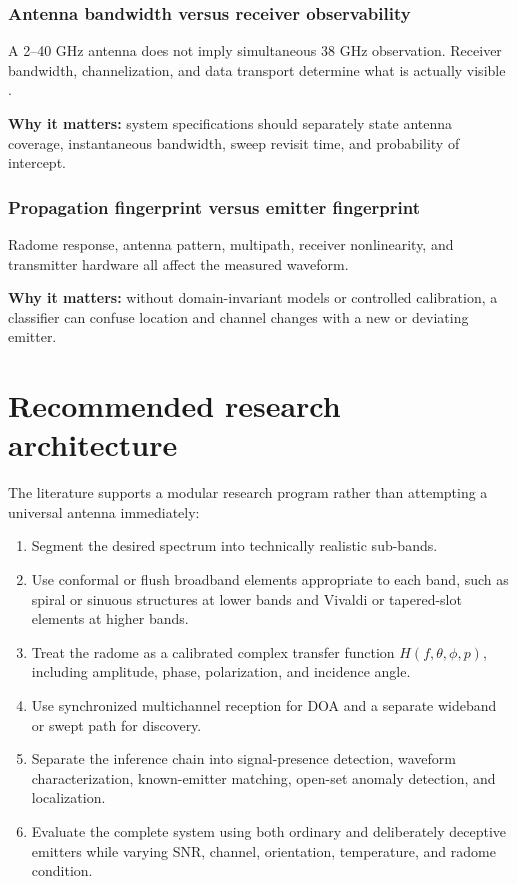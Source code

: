 \documentclass[
  10pt,
]{article}
\providecommand{\tightlist}{%
  \setlength{\itemsep}{0pt}\setlength{\parskip}{0pt}}
\begin{document}
\subsubsection{Antenna bandwidth versus receiver
observability}\label{antenna-bandwidth-versus-receiver-observability}

A 2--40 GHz antenna does not imply simultaneous 38 GHz observation.
Receiver bandwidth, channelization, and data transport determine what is
actually visible \citep{flak2022, madanayake2024, subbaraman2022}.

\textbf{Why it matters:} system specifications should separately state
antenna coverage, instantaneous bandwidth, sweep revisit time, and
probability of intercept.

\subsubsection{Propagation fingerprint versus emitter
fingerprint}\label{propagation-fingerprint-versus-emitter-fingerprint}

Radome response, antenna pattern, multipath, receiver nonlinearity, and
transmitter hardware all affect the measured waveform.

\textbf{Why it matters:} without domain-invariant models or controlled
calibration, a classifier can confuse location and channel changes with
a new or deviating emitter.

\section{Recommended research
architecture}\label{recommended-research-architecture}

The literature supports a modular research program rather than
attempting a universal antenna immediately:

\begin{enumerate}
\def\labelenumi{\arabic{enumi}.}
\tightlist
\item
  Segment the desired spectrum into technically realistic sub-bands.
\item
  Use conformal or flush broadband elements appropriate to each band,
  such as spiral or sinuous structures at lower bands and Vivaldi or
  tapered-slot elements at higher bands.
\item
  Treat the radome as a calibrated complex transfer function
  \(H(f,\theta,\phi,p)\), including amplitude, phase, polarization, and
  incidence angle.
\item
  Use synchronized multichannel reception for DOA and a separate
  wideband or swept path for discovery.
\item
  Separate the inference chain into signal-presence detection, waveform
  characterization, known-emitter matching, open-set anomaly detection,
  and localization.
\item
  Evaluate the complete system using both ordinary and deliberately
  deceptive emitters while varying SNR, channel, orientation,
  temperature, and radome condition.
\end{enumerate}
\end{document}
